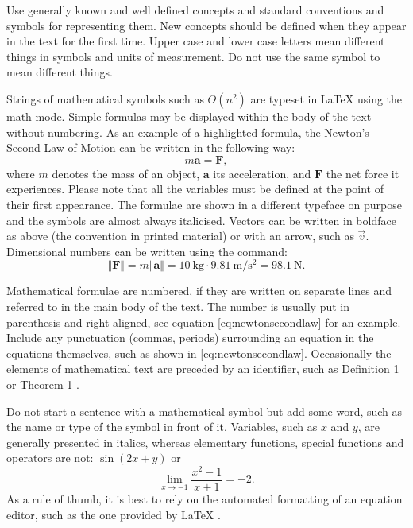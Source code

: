 Use generally known and well defined concepts and standard conventions and symbols for representing them. New concepts should be defined when they appear in the text for the first time. Upper case and lower case letters mean different things in symbols and units of measurement. Do not use the same symbol to mean different things.

Strings of mathematical symbols such as $\Theta(n^2)$ are typeset in \LaTeX{} using the math mode. Simple formulas may be displayed within the body of the text without numbering. As an example of a highlighted formula, the Newton’s Second Law of Motion can be written in the following way:
\begin{equation}\label{eq:newtonsecondlaw}
    m\mathbf{a} = \mathbf{F},
\end{equation}
where $m$ denotes the mass of an object, $\mathbf{a}$ its acceleration, and $\mathbf{F}$ the net force it experiences. Please note that all the variables must be defined at the point of their first appearance. The formulae are shown in a different typeface on purpose and the symbols are almost always italicised. Vectors can be written in boldface as above (the convention in printed material) or with an arrow, such as $\vec{v}$. Dimensional numbers can be written using the  command:
\begin{equation*}
    \Vert\mathbf{F}\Vert = m\Vert\mathbf{a}\Vert = \SI{10}{\kilogram} \cdot \SI{9.81}{\metre\per\second\squared} = \SI{98.1}{\newton}.
\end{equation*}

Mathematical formulae are numbered, if they are written on separate lines and referred to in the main body of the text. The number is usually put in parenthesis and right aligned, see equation \eqref{eq:newtonsecondlaw} for an example. Include any punctuation (commas, periods) surrounding an equation in the equations themselves, such as shown in \eqref{eq:newtonsecondlaw}. Occasionally the elements of mathematical text are preceded by an identifier, such as Definition 1 or Theorem 1 \parencite{matohje2009}.

Do not start a sentence with a mathematical symbol but add some word, such as the name or type of the symbol in front of it. Variables, such as $x$ and $y$, are generally presented in italics, whereas elementary functions, special functions and operators are not: $\sin(2x + y)$ or
\begin{equation*}
    \lim_{x \rightarrow -1}\frac{x^2 - 1}{x + 1} = -2.
\end{equation*}
As a rule of thumb, it is best to rely on the automated formatting of an equation editor, such as the one provided by \LaTeX{} \parencite{notsoshort}.

